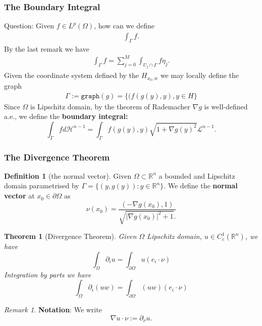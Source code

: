 \documentclass[a4paper,11pt,oneside,fleqn]{book}
\newtheorem{theorem}{Theorem}[section]
\theoremstyle{definition}
\newtheorem{definition}{Definition}[section]
\theoremstyle{remark}
\newtheorem*{remark}{Remark}
\begin{document}
\subsubsection{The Boundary Integral}
Question: Given $f \in L^p(\Omega)$, how can we define 
\begin{align*}
	\int_\Gamma f.
\end{align*}
By the last remark we have
\begin{align*}
	\int_\Gamma f  = \sum_{j = 0}^M \int_{U_j\cap \Gamma} f\eta_j.
\end{align*}
Given the coordinate system defined by the $H_{x_0, w}$ we may locally define the graph
\begin{align*}
	\Gamma := \texttt{graph}(g) = \{(f(g(y), y), y \in H\}
\end{align*}  
Since $\Omega$ is Lipschitz domain, by the theorem of Rademacher $\nabla g$ is well-defined a.e.,  we define the \textbf{boundary integral:}
\begin{equation}
	\int_\Gamma f d\mathcal{H}^{n -1} = \int_\Gamma f(g(y), y) \sqrt{1 + \nabla g(y)^2} \mathcal{L}^{n -1}. 
\end{equation}


\subsubsection{The Divergence Theorem}
\begin{definition}[the normal vector]
	Given $\Omega \subset \mathbb{R}^n$ a bounded and Lipschitz domain parametrised by $\Gamma = \{(y, g(y)): y \in \mathbb{R}^n \}$. We define the \textbf{normal vector} at $x_0 \in \partial\Omega$ as 
	\begin{equation}
		\nu(x_0) = \frac{(- \nabla g(x_0), 1) }{\sqrt{|\nabla g(x_0)|^2 + 1}.}
	\end{equation}
\end{definition}

\begin{theorem}[Divergence Theorem]
	Given $\Omega$ Lipschitz domain, $u \in C^1_c(\mathbb{R}^n)$,  we have
	\begin{equation}
		\int_\Omega \partial_i u  = \int_{\partial\Omega} u(e_i \cdot \nu)
	\end{equation}
	Integration by parts we have
	\begin{equation}
		\int_\Omega \partial_i(uw) = \int_{\partial\Omega} (uw)(e_i \cdot \nu)
	\end{equation}
\end{theorem}
\begin{remark}
\textbf{Notation}: We write 
\begin{equation}
	\nabla u \cdot \nu := \partial_\nu u. 
\end{equation}	
\end{remark}
\end{document}
